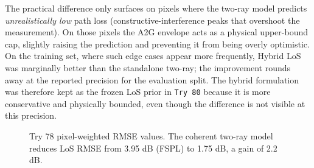 \documentclass[11pt,a4paper]{article}
\begin{document}
The practical difference only surfaces on pixels where the two-ray model
predicts \emph{unrealistically low} path loss (constructive-interference peaks
that overshoot the measurement). On those pixels the A2G envelope acts as a
physical upper-bound cap, slightly raising the prediction and preventing it
from being overly optimistic. On the training set, where such edge cases
appear more frequently, Hybrid LoS was marginally better than the standalone
two-ray; the improvement rounds away at the reported precision for the
evaluation split. The hybrid formulation was therefore kept as the frozen LoS
prior in \texttt{Try 80} because it is more conservative and physically
bounded, even though the difference is not visible at this precision.

\begin{figure}[H]
\centering
{}
\caption{Try 78 pixel-weighted RMSE values. The coherent two-ray model
reduces LoS RMSE from 3.95 dB (FSPL) to 1.75 dB, a gain of 2.2 dB.}
\label{fig:try78_rmse}
\end{figure}
\end{document}
